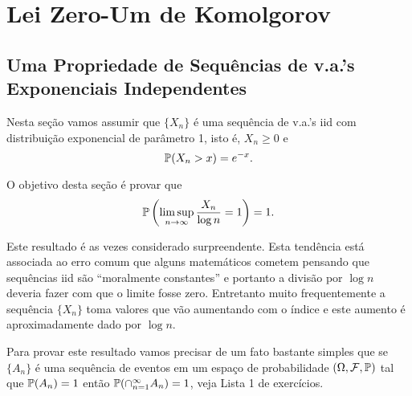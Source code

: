 \chapter[Aula 8]{Lei Zero-Um de Komolgorov}
\chaptermark{}

\section{Uma Propriedade de Sequências de v.a.'s Exponenciais Independentes}


Nesta seção vamos assumir que $\{X_n\}$ é uma sequência 
de v.a.'s iid com distribuição exponencial de parâmetro 1,
isto é, $X_n\geq 0$ e  
\[
	\P(X_n>x)=e^{-x}.
\] 

O objetivo desta seção é provar que 
%
	\[
		\P
		\left(
			\limsup_{n\to\infty}
			\frac{X_n}{\log n} 
			=1
		\right)	
		=1.
	\]

Este resultado é as vezes considerado surpreendente.
Esta tendência está associada ao erro comum que alguns
matemáticos cometem pensando que sequências iid 
são ``moralmente constantes'' e portanto a divisão 
por $\log n$ deveria fazer com que o limite fosse
zero. 
Entretanto muito frequentemente a sequência $\{X_n\}$
toma valores que vão aumentando com o índice e 
este aumento é aproximadamente dado por $\log n$.

Para provar este resultado vamos precisar de um fato 
bastante simples que se $\{A_n\}$ é uma sequência 
de eventos em um espaço de probabilidade $(\Omega,\F,\P)$
tal que $\P(A_n)=1$ então $\P(\cap_{n=1}^{\infty} A_n)=1$,
veja Lista 1 de exercícios. 
 